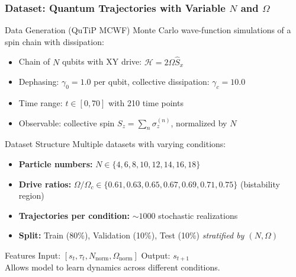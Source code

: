 \documentclass[aspectratio=169]{beamer}
\begin{document}
\begin{frame}
    \frametitle{Dataset: Quantum Trajectories with Variable $N$ and $\Omega$}
    
    \begin{block}{Data Generation (QuTiP MCWF)}
        Monte Carlo wave-function simulations of a spin chain with dissipation:
        \begin{itemize}
            \item Chain of $N$ qubits with XY drive: $\mathcal{H} = 2\Omega \hat{S}_x$
            \item Dephasing: $\gamma_0 = 1.0$ per qubit, collective dissipation: $\gamma_c = 10.0$
            \item Time range: $t \in [0, 70]$ with 210 time points
            \item Observable: collective spin $S_z = \sum_n \sigma_z^{(n)}$, normalized by $N$
        \end{itemize}
    \end{block}

    \begin{block}{Dataset Structure}
        Multiple datasets with varying conditions:
        \begin{itemize}
            \item \textbf{Particle numbers:} $N \in \{4, 6, 8, 10, 12, 14, 16, 18\}$
            \item \textbf{Drive ratios:} $\Omega/\Omega_c \in \{0.61, 0.63, 0.65, 0.67, 0.69, 0.71, 0.75\}$ (bistability region)
            \item \textbf{Trajectories per condition:} $\sim 1000$ stochastic realizations
            \item \textbf{Split:} Train (80\%), Validation (10\%), Test (10\%) \emph{stratified by $(N, \Omega)$}
        \end{itemize}
    \end{block}

    \begin{block}{Features}
        Input: $[s_t, \tau_t, N_{\text{norm}}, \Omega_{\text{norm}}]$ \quad Output: $s_{t+1}$\\
        Allows model to learn dynamics across different conditions.
    \end{block}
\end{frame}
\end{document}
